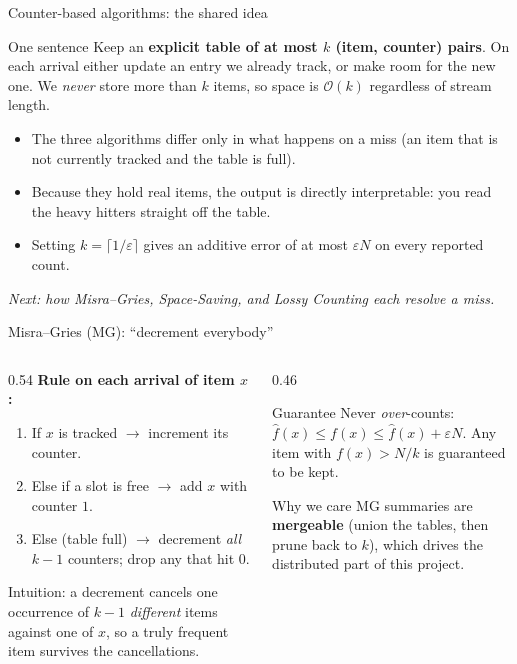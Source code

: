 \documentclass[11pt,aspectratio=169]{beamer}
\newcommand{\bigO}[1]{\mathcal{O}\!\left(#1\right)}
\begin{document}
\begin{frame}{Counter-based algorithms: the shared idea}
  \begin{block}{One sentence}
    Keep an \textbf{explicit table of at most $k$ (item, counter) pairs}. On each
    arrival either update an entry we already track, or make room for the new one.
    We \emph{never} store more than $k$ items, so space is $\bigO{k}$ regardless of
    stream length.
  \end{block}
  \begin{itemize}
    \item The three algorithms differ only in \alert{what happens on a miss}
          (an item that is not currently tracked and the table is full).
    \item Because they hold real items, the output is directly interpretable:
          you read the heavy hitters straight off the table.
    \item Setting $k=\lceil 1/\varepsilon\rceil$ gives an additive error of at most
          $\varepsilon N$ on every reported count.
  \end{itemize}
  \centering\small
  \emph{Next: how Misra--Gries, Space-Saving, and Lossy Counting each resolve a miss.}
\end{frame}

\begin{frame}{Misra--Gries (MG): ``decrement everybody''}
  \begin{columns}[T]
    \begin{column}{0.54\textwidth}
      \textbf{Rule on each arrival of item $x$:}
      \begin{enumerate}
        \item If $x$ is tracked $\to$ increment its counter.
        \item Else if a slot is free $\to$ add $x$ with counter $1$.
        \item Else (table full) $\to$ \alert{decrement \emph{all} $k-1$ counters};
              drop any that hit $0$.
      \end{enumerate}
      \vspace{0.4em}
      Intuition: a decrement cancels one occurrence of $k-1$ \emph{different}
      items against one of $x$, so a truly frequent item survives the cancellations.
    \end{column}
    \begin{column}{0.46\textwidth}
      \begin{block}{Guarantee}
        Never \emph{over}-counts: $\hat f(x)\le f(x)\le \hat f(x)+\varepsilon N$.
        Any item with $f(x) > N/k$ is guaranteed to be kept.
      \end{block}
      \begin{exampleblock}{Why we care}
        MG summaries are \textbf{mergeable} (union the tables, then prune back to
        $k$), which drives the distributed part of this project.
      \end{exampleblock}
    \end{column}
  \end{columns}
\end{frame}
\end{document}
